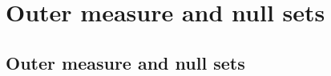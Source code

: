 
\sectionnewpage
\section{Outer measure and null sets}
\label{sec:outermeasure}


%
%
%
%
%
%
%
%

\subsection{Outer measure and null sets}

%
%
%

